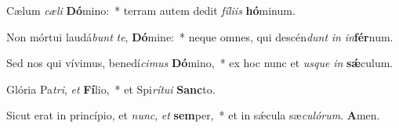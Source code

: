 \item Cælum \textit{cæ}\textit{li} \textbf{Dó}mino:~* terram autem dedit \textit{fí}\textit{li}\textit{is} \textbf{hó}minum.

\item Non mórtui laudá\textit{bunt} \textit{te}, \textbf{Dó}mine:~* neque omnes, qui descén\textit{dunt} \textit{in} \textit{in}\textbf{fér}num.

\item Sed nos qui vívimus, benedí\textit{ci}\textit{mus} \textbf{Dó}mino,~* ex hoc nunc et \textit{us}\textit{que} \textit{in} \textbf{sǽ}culum.

\item Glória Pa\textit{tri}, \textit{et} \textbf{Fí}lio,~* et Spi\textit{rí}\textit{tu}\textit{i} \textbf{Sanc}to.

\item Sicut erat in princípio, et \textit{nunc}, \textit{et} \textbf{sem}per,~* et in sǽcula sæ\textit{cu}\textit{ló}\textit{rum}. \textbf{A}men.
